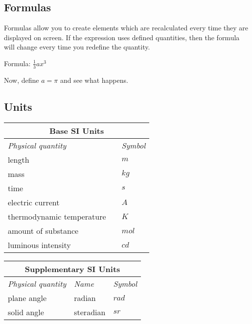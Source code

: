 \documentclass{article}
\begin{document}
\subsection{Formulas}

Formulas allow you to create elements which are recalculated every time they
are displayed on screen. If the expression uses defined quantities, then the
formula will change every time you redefine the quantity.

Formula: $%
\frac{1}{3}ax^{3}%
$

Now, define $a=\pi $ and see what happens.

\subsection{Units}

\hspace{\parindent}%
\begin{tabular}{lll}
\multicolumn{3}{c}{\textbf{Base SI Units}} \\ \hline
\textit{Physical quantity} &  & \textit{Symbol} \\ \hline
length &  & $\unit{m}$ \\ 
mass &  & $\unit{kg}$ \\ 
time &  & $\unit{s}$ \\ 
electric current &  & $\unit{A}$ \\ 
thermodynamic temperature &  & $\unit{K}$ \\ 
amount of substance &  & $\unit{mol}$ \\ 
luminous intensity &  & $\unit{cd}$ \\ \hline
\end{tabular}

\begin{tabular}{lll}
\multicolumn{3}{c}{\textbf{Supplementary SI Units}} \\ \hline
\textit{Physical quantity} & \textit{Name} & \textit{Symbol} \\ \hline
plane angle & radian & $\unit{rad}$ \\ 
solid angle & steradian & $\unit{sr}$ \\ \hline
\end{tabular}
\end{document}
